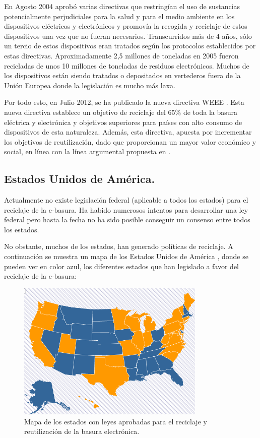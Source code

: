 En Agosto 2004 aprobó varias directivas que restringían el uso de sustancias potencialmente perjudiciales para la salud y para el medio ambiente en los dispositivos eléctricos y electrónicos y promovía la recogida y reciclaje de estos dispositivos una vez que no fueran necesarios. Transcurridos más de 4 años, sólo un tercio de estos dispositivos eran tratados según los protocolos establecidos por estas directivas. Aproximadamente 2,5 millones de toneladas en 2005 fueron recicladas de unos 10 millones de toneladas de residuos electrónicos. Muchos de los dispositivos están siendo tratados o depositados en vertederos fuera de la Unión Europea donde la legislación es mucho más laxa.

Por todo esto, en Julio 2012, se ha publicado la nueva directiva WEEE \cite{WEEE}. Esta nueva directiva establece un objetivo de reciclaje del 65\% de toda la basura eléctrica y electrónica y objetivos superiores para países con alto consumo de dispositivos de esta naturaleza. Además, esta directiva, apuesta por incrementar los objetivos de reutilización, dado que proporcionan un mayor valor económico y social, en línea con la línea argumental propuesta en \cite{reusing-silicon}.

\subsection{Estados Unidos de América.}

Actualmente no existe legislación federal (aplicable a todos los estados) para el reciclaje de la e-basura. Ha habido numerosos intentos para desarrollar una ley federal pero hasta la fecha no ha sido posible conseguir un consenso entre todos los estados.

No obstante, muchos de los estados, han generado políticas de reciclaje. A continuación se muestra un mapa de los Estados Unidos de América \cite{ercc}, donde se pueden ver en color azul, los diferentes estados que han legislado a favor del reciclaje de la e-basura:

\begin{figure}[H]
\begin{center}
\includegraphics[width=0.8\textwidth]{img/usa_map}
\caption{Mapa de los estados con leyes aprobadas para el reciclaje y reutilización de la basura electrónica.}
\end{center}
\end{figure}

